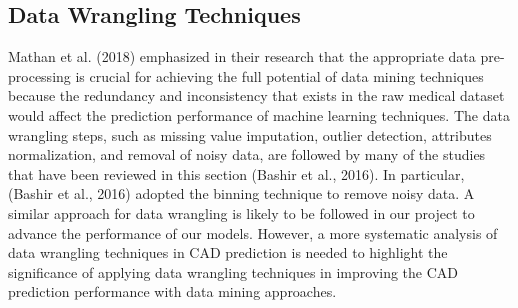 \documentclass[a4paper, 12pt]{article}
\begin{document}
    \subsection{Data Wrangling Techniques}
    Mathan et al. (2018) emphasized in their research that the appropriate data pre-processing is crucial for achieving the full potential of data mining techniques because the redundancy and inconsistency that exists in the raw medical dataset would affect the prediction performance of machine learning techniques. The data wrangling steps, such as missing value imputation, outlier detection, attributes normalization, and removal of noisy data, are followed by many of the studies that have been reviewed in this section (Bashir et al., 2016). In particular, (Bashir et al., 2016) adopted the binning technique to remove noisy data. A similar approach for data wrangling is likely to be followed in our project to advance the performance of our models. However, a more systematic analysis of data wrangling techniques in CAD prediction is needed to highlight the significance of applying data wrangling techniques in improving the CAD prediction performance with data mining approaches.
    
\end{document}
